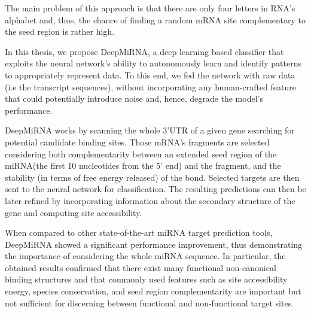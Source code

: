 The main problem of this approach is that there are only four letters in RNA's alphabet and, thus, the chance of finding a random mRNA site complementary to the seed region is rather high.

In this thesis, we propose DeepMiRNA, a deep learning based classifier that exploits the neural network's ability to autonomously learn and identify patterns to appropriately represent data. To this end, we fed the network with raw data (i.e the transcript sequences), without incorporating any human-crafted feature that could potentially introduce noise and, hence, degrade the model's performance. 

DeepMiRNA works by scanning the whole 3'UTR of a given gene searching for potential candidate binding sites. Those mRNA's fragments are selected considering both complementarity between an extended seed region of the miRNA(the first 10 nucleotides from the 5' end)  and the fragment, and the stability (in terms of free energy released) of the bond. Selected targets are then sent to the neural network for classification. The resulting predictions can then be later refined by incorporating information about the secondary structure of the gene and computing site accessibility.

When compared to other state-of-the-art miRNA target prediction tools, DeepMiRNA showed a significant performance improvement, thus demonstrating the importance of considering the whole miRNA sequence.  In particular, the obtained results confirmed that there exist many functional non-canonical binding structures and that commonly used features such as site accessibility energy, species conservation, and seed region complementarity are important but not sufficient for discerning between functional and non-functional target sites.  